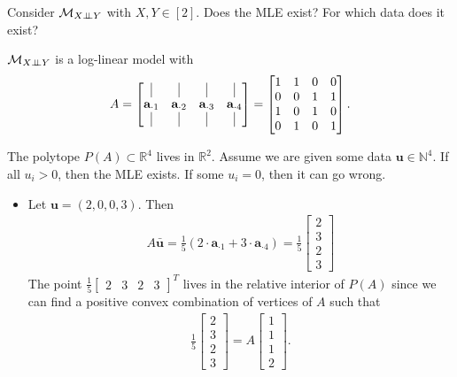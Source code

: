 \begin{eg}
  Consider \( \mathcal{M}_{X \perp \!\!\! \perp Y} \) with \( X,Y \in [2] \). Does the MLE exist? For which data does it exist?
   
  \( \mathcal{M}_{X \perp \!\!\! \perp Y} \) is a log-linear model with 
  \begin{align*}
    A = \begin{bmatrix}
      \vline & \vline & \vline & \vline \\
      \mathbf a_{\cdot 1} &  \mathbf a_{\cdot 2} &  \mathbf a_{\cdot 3} &  \mathbf a_{\cdot 4} \\
      \vline & \vline & \vline & \vline 
    \end{bmatrix} = \begin{bmatrix}
      1 & 1 & 0 & 0 \\
      0 & 0 & 1 &1 \\
      1 & 0 & 1 & 0 \\
      0 & 1 & 0 & 1 
    \end{bmatrix}.
  \end{align*}

  The polytope \( P(A) \subset \mathbb{R}^4 \) lives in \( \mathbb{R}^2 \). Assume we are given some data \( \mathbf u  \in \mathbb{N}^4\). If all \( u_i > 0 \), then the MLE exists. If some \( u_i =0 \), then it can go wrong.

  \begin{itemize}
    \item Let \( \mathbf u = (2,0,0,3) \). Then 
    \begin{align*}
      A \bar{\mathbf{u}} = \frac{1}{5}(2 \cdot \mathbf{a}_{\cdot 1} + 3 \cdot \mathbf{a}_{\cdot 4}) = \frac{1}{5}\begin{bmatrix}
        2 \\ 3 \\ 2 \\ 3
      \end{bmatrix}
    \end{align*}
    The point \( \frac{1}{5}\begin{bmatrix}
      2 & 3 & 2 & 3
    \end{bmatrix}^T \) lives in the relative interior of \( P(A) \) since we can find a positive convex combination of vertices of \( A \) such that 
    \begin{align*}
      \frac{1}{5}\begin{bmatrix}
        2 \\ 3 \\ 2 \\ 3
      \end{bmatrix} = A \begin{bmatrix}
        1 \\ 1 \\ 1 \\ 2
      \end{bmatrix}.
    \end{align*}


\end{itemize}
\end{eg}
